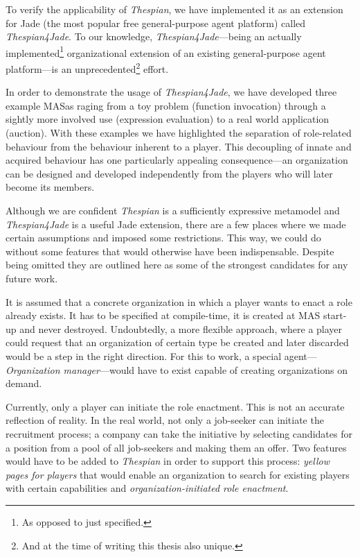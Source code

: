 To verify the applicability of \textit{Thespian}, we have implemented it as an extension for Jade (the most popular free general-purpose agent platform) called \textit{Thespian4Jade}.
To our knowledge, \textit{Thespian4Jade}---being an actually implemented\footnote{As opposed to just specified.} organizational extension of an existing general-purpose agent platform---is an unprecedented\footnote{And at the time of writing this thesis also unique.} effort.

In order to demonstrate the usage of \textit{Thespian4Jade}, we have developed three example MASas raging from a toy problem (function invocation) through a sightly more involved use (expression evaluation) to a real world application (auction).
With these examples we have highlighted the separation of role-related behaviour from the behaviour inherent to a player.
This decoupling of innate and acquired behaviour has one particularly appealing consequence---an organization can be designed and developed independently from the players who will later become its members. 


Although we are confident \textit{Thespian} is a sufficiently expressive metamodel and \textit{Thespian4Jade} is a useful Jade extension, there are a few places where we made certain assumptions and imposed some restrictions.
This way, we could do without some features that would otherwise have been indispensable.
Despite being omitted they are outlined here as some of the strongest candidates for any future work.

It is assumed that a concrete organization in which a player wants to enact a role already exists.
It has to be specified at compile-time, it is created at MAS start-up and never destroyed.
Undoubtedly, a more flexible approach, where a player could request that an organization of certain type be created and later discarded would be a step in the right direction.
For this to work, a special agent---\textit{Organization manager}---would have to exist capable of creating organizations on demand.

Currently, only a player can initiate the role enactment.
This is not an accurate reflection of reality.
In the real world, not only a job-seeker can initiate the recruitment process; a company can take the initiative by selecting candidates for a position from a pool of all job-seekers and making them an offer.
Two features would have to be added to \textit{Thespian} in order to support this process: \textit{yellow pages for players} that would enable an organization to search for existing players with certain capabilities and \textit{organization-initiated role enactment}.

